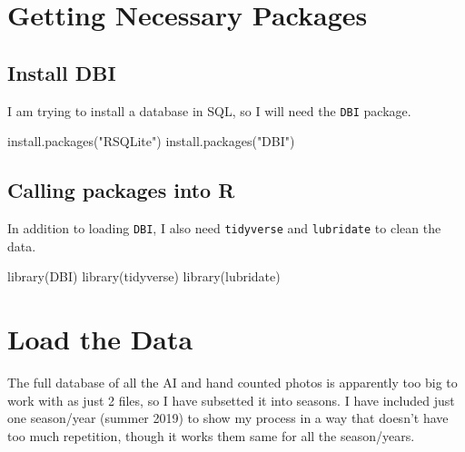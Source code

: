 \documentclass[
]{book}
\newenvironment{Shaded}{\begin{snugshade}}{\end{snugshade}}
\newcommand{\FunctionTok}[1]{\textcolor[rgb]{0.00,0.00,0.00}{#1}}
\newcommand{\NormalTok}[1]{#1}
\newcommand{\StringTok}[1]{\textcolor[rgb]{0.31,0.60,0.02}{#1}}
\begin{document}
\hypertarget{getting-necessary-packages}{%
\section{Getting Necessary Packages}\label{getting-necessary-packages}}

\hypertarget{install-dbi}{%
\subsection{Install DBI}\label{install-dbi}}

I am trying to install a database in SQL, so I will need the \texttt{DBI} package.

\begin{Shaded}
\begin{Highlighting}[]
\FunctionTok{install.packages}\NormalTok{(}\StringTok{"RSQLite"}\NormalTok{)}
\FunctionTok{install.packages}\NormalTok{(}\StringTok{"DBI"}\NormalTok{)}
\end{Highlighting}
\end{Shaded}

\hypertarget{calling-packages-into-r}{%
\subsection{Calling packages into R}\label{calling-packages-into-r}}

In addition to loading \texttt{DBI}, I also need \texttt{tidyverse} and \texttt{lubridate} to clean the data.

\begin{Shaded}
\begin{Highlighting}[]
\FunctionTok{library}\NormalTok{(DBI)}
\FunctionTok{library}\NormalTok{(tidyverse)}
\FunctionTok{library}\NormalTok{(lubridate)}
\end{Highlighting}
\end{Shaded}

\hypertarget{load-the-data}{%
\section{Load the Data}\label{load-the-data}}

The full database of all the AI and hand counted photos is apparently too big to work with as just 2 files, so I have subsetted it into seasons. I have included just one season/year (summer 2019) to show my process in a way that doesn't have too much repetition, though it works them same for all the season/years.
\end{document}

